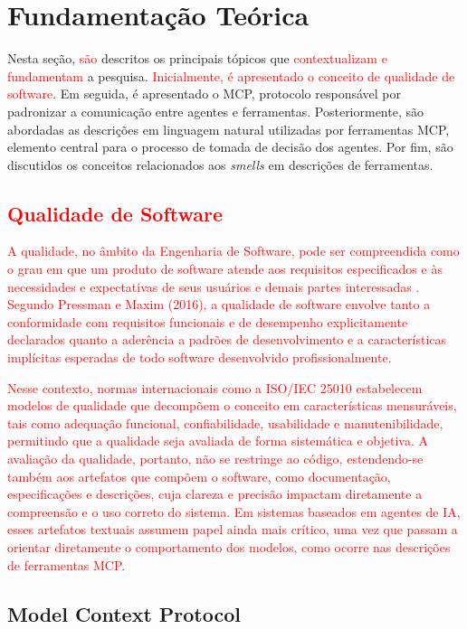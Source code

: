 \section{Fundamentação Teórica}
\label{sec:fundamentacao}

Nesta seção, \textcolor{red}{são} descritos os principais tópicos que \textcolor{red}{contextualizam e fundamentam} a pesquisa. \textcolor{red}{Inicialmente, é apresentado o conceito de qualidade de software}. Em seguida, é apresentado o MCP, protocolo responsável por padronizar a comunicação entre agentes e ferramentas. Posteriormente, são abordadas as descrições em linguagem natural utilizadas por ferramentas MCP, elemento central para o processo de tomada de decisão dos agentes. Por fim, são discutidos os conceitos relacionados aos \textit{smells} em descrições de ferramentas.

\subsection{\textcolor{red}{Qualidade de Software}}
\textcolor{red}{A qualidade, no âmbito da Engenharia de Software, pode ser compreendida como o grau em que um produto de software atende aos requisitos especificados e às necessidades e expectativas de seus usuários e demais partes interessadas \cite{iso24765}. Segundo Pressman e Maxim (2016)\nocite{pressman2016}, a qualidade de software envolve tanto a conformidade com requisitos funcionais e de desempenho explicitamente declarados quanto a aderência a padrões de desenvolvimento e a características implícitas esperadas de todo software desenvolvido profissionalmente.}

\textcolor{red}{Nesse contexto, normas internacionais como a ISO/IEC 25010 \cite{iso25010} estabelecem modelos de qualidade que decompõem o conceito em características mensuráveis, tais como adequação funcional, confiabilidade, usabilidade e manutenibilidade, permitindo que a qualidade seja avaliada de forma sistemática e objetiva. A avaliação da qualidade, portanto, não se restringe ao código, estendendo-se também aos artefatos que compõem o software, como documentação, especificações e descrições, cuja clareza e precisão impactam diretamente a compreensão e o uso correto do sistema. Em sistemas baseados em agentes de IA, esses artefatos textuais assumem papel ainda mais crítico, uma vez que passam a orientar diretamente o comportamento dos modelos, como ocorre nas descrições de ferramentas MCP.}

\subsection{Model Context Protocol}

